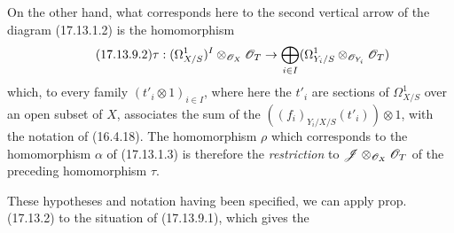 \begin{env}[17.13.9]
On the other hand, what corresponds here to the second vertical arrow of the diagram (17.13.1.2) is the homomorphism
\[
\label{IV.17.13.9.2}
\tag{17.13.9.2}
\tau:(\Omega^1_{X/S})^I\otimes_{\mathscr{O}_X}\mathscr{O}_T\to\bigoplus_{i\in I}(\Omega^1_{Y_i/S}\otimes_{\mathscr{O}_{Y_i}}\mathscr{O}_T)
\]
which, to every family $(t'_i\otimes1)_{i\in I}$, where here the $t'_i$ are sections of $\Omega^1_{X/S}$ over an open subset of $X$, associates the sum of the $((f_i)_{Y_i/X/S}(t'_i))\otimes1$, with the notation of (16.4.18). The homomorphism $\rho$ which corresponds to the homomorphism $\alpha$ of (17.13.1.3) is therefore the \emph{restriction} to $\mathscr{J}\otimes_{\mathscr{O}_X}\mathscr{O}_T$ of the preceding homomorphism $\tau$.

These hypotheses and notation having been specified, we can apply prop. (17.13.2) to the situation of (17.13.9.1), which gives the
\end{env}

